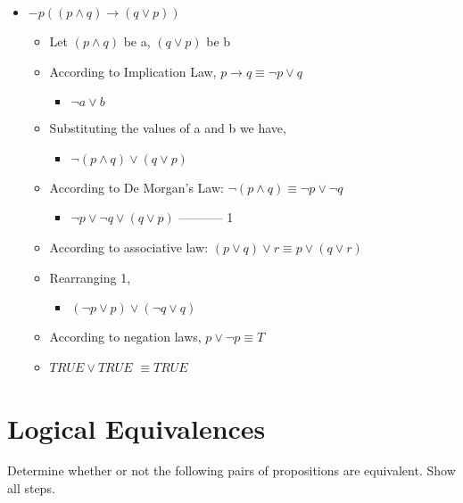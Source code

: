 \documentclass[11pt]{article}
\begin{document}
 \begin{itemize}
\item $-p((p \wedge  q) \to (q \vee p))$

 \begin{itemize}
 \item Let $(p \wedge q)$ be a, $(q \vee p)$ be b 
\item According to Implication Law, $ p \to q \equiv \neg p \vee q $
 \begin{itemize}
 \item $ \neg a \vee b $
 \end{itemize}
\item Substituting the values of a and b we have,
 \begin{itemize}
 \item $ \neg (p \wedge q) \vee ( q \vee p)$ 
 \end{itemize}
\item According to De Morgan's Law: $ \neg(p \wedge q) \equiv \neg p \vee  \neg q$ 
 \begin{itemize}
 \item $\neg p \vee \neg q \vee (q \vee p)$ ----------- 1
\end{itemize}
\item According to associative law: $(p \vee q) \vee r \equiv p \vee (q \vee r) $
\item Rearranging 1, 
 \begin{itemize}
 \item $(\neg p \vee p) \vee (\neg q \vee q)$
\end{itemize}
\item According to negation laws, $ p \vee \neg p \equiv T$
\item $TRUE \vee TRUE$ $ \equiv TRUE$
\end{itemize}
\end{itemize}







\section{Logical Equivalences}

Determine whether or not the following pairs of propositions are equivalent. Show all steps.
\end{document}
